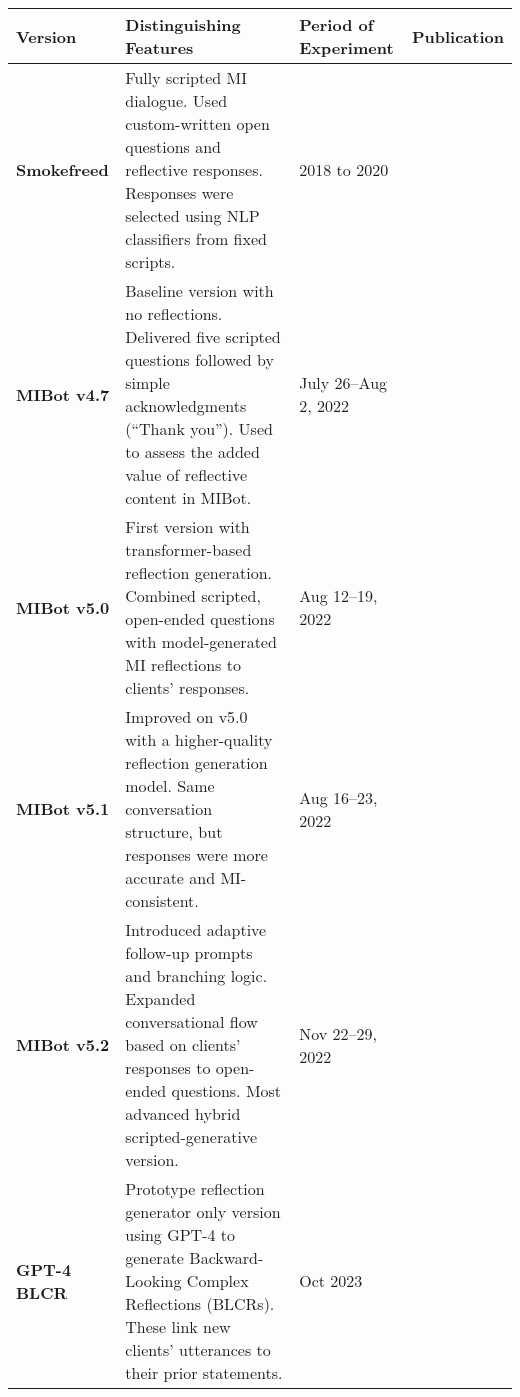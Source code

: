 \begin{table}[!ht]
        \small
        \centering
        \begingroup
        \setlength{\tabcolsep}{4pt}
        \begin{tabularx}{\textwidth}{@{}>{\raggedright\arraybackslash}p{}YYY@{}}
		\toprule
		\textbf{Version}     & \textbf{Distinguishing Features}                                                                                                                                                               & \textbf{Period of Experiment}   & \textbf{Publication}     \\
		\midrule
		\textbf{Smokefreed}  & Fully scripted MI dialogue. Used custom-written open ques\-tions and reflective responses. Responses were selected using NLP classifiers from fixed scripts.                                     & 2018 to 2020                    & \citet{Almusharraf_2019} \\
		\hline
		\textbf{MIBot v4.7}  & Baseline version with no reflections. Delivered five scripted questions followed by simple acknowledgments (``Thank you''). Used to assess the added value of reflective content in MIBot.     & July 26–Aug 2, 2022             & \citet{brown2023mi}      \\
		\hline
		\textbf{MIBot v5.0}  & First version with transformer-based reflection generation. Combined scripted, open-ended questions with model-generated MI reflections to clients' responses.                                 & Aug 12–19, 2022                 & \citet{brown2023mi}      \\
		\hline
		\textbf{MIBot v5.1}  & Improved on v5.0 with a higher-quality reflection generation model. Same conversation structure, but responses were more accurate and MI-consistent.                                           & Aug 16–23, 2022                 & \citet{brown2023mi}      \\
		\hline
		\textbf{MIBot v5.2}  & Introduced adaptive follow-up prompts and branching logic. Expanded conversational flow based on clients' responses to open-ended questions. Most advanced hybrid scripted-generative version. & Nov 22–29, 2022                 & \citet{brown2023mi}      \\
		\hline
		\textbf{GPT-4 BLCR}  & Prototype reflection generator only version using GPT-4 to generate Backward-Looking Complex Reflections (BLCRs). These link new clients' utterances to their prior statements.
		                     & Oct 2023
		                     & \citet{brown2023mi}                                                                                                                                                                                                                                         \\

\end{tabularx}
\end{table}
